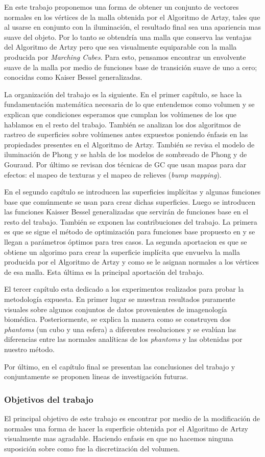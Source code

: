En este trabajo proponemos una forma de obtener un conjunto de vectores normales en los vértices de la malla obtenida por el Algoritmo de Artzy, tales que al usarse en conjunto con la iluminación, el resultado final sea una apariencia mas suave del objeto. Por lo tanto se obtendría una malla que conserva las ventajas del Algoritmo de Artzy pero que sea visualmente equiparable con la malla producida por \emph{Marching Cubes}. Para esto, pensamos encontrar un envolvente suave de la malla por medio de funciones base de transición suave de uno a cero; conocidas como Kaiser Bessel generalizadas.

La organización del trabajo es la siguiente. En el primer capítulo, se hace la fundamentación matemática necesaria de lo que entendemos como volumen y se explican que condiciones esperamos que cumplan los volúmenes de los que hablamos en el resto del trabajo. También se analizan los dos algoritmos de rastreo de superficies sobre volúmenes antes expuestos poniendo énfasis en las propiedades presentes en el Algoritmo de Artzy. También se revisa el modelo de iluminación de Phong y se habla de los modelos de sombreado de Phong y de Gouraud. Por último se revisan dos técnicas de GC que usan mapas para dar efectos: el mapeo de texturas y el mapeo de relieves (\emph{bump mapping}).

En el segundo capítulo se introducen las superficies implícitas y algunas funciones base que comúnmente se usan para crear dichas superficies. Luego se introducen las funciones Kaisser Bessel generalizadas que servirán de funciones base en el resto del trabajo. También se exponen las contribuciones del trabajo. La primera es que se sigue el método de optimización para funciones base propuesto en \cite{EdgarOptimization} y se llegan a parámetros óptimos para tres casos. La segunda aportacion es que se obtiene un algorimo para crear la superficie implícita que envuelva la malla producida por el Algoritmo de Artzy y como se le asignan normales a los vértices de esa malla. Esta última es la principal aportación del trabajo.

El tercer capítulo esta dedicado a los experimentos realizados para probar la metodología expuesta. En primer lugar se muestran resultados puramente visuales sobre algunos conjuntos de datos provenientes de imagenología biomédica. Posteriormente, se explica la manera como se construyen dos \emph{phantoms} (un cubo y una esfera) a diferentes resoluciones y se evalúan las diferencias entre las normales analíticas de los \emph{phantoms} y las obtenidas por nuestro método.

Por último, en el capítulo final se presentan las conclusiones del trabajo y conjuntamente se proponen lineas de investigación futuras.

\subsubsection*{Objetivos del trabajo}

El principal objetivo de este trabajo es encontrar por medio de la modificación de normales una forma de hacer la superficie obtenida por el Algoritmo de Artzy visualmente mas agradable. Haciendo enfasis en que no hacemos ninguna suposición sobre como fue la discretización del volumen.
